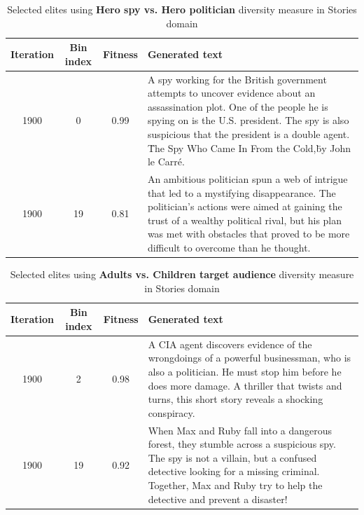 \begin{table}[H]
  \caption{Selected elites using \textbf{Hero spy vs. Hero politician} diversity measure in Stories domain}
  \label{tab:dm-hero}
  \begin{center}
  \begin{tabular}{cccp{8.5cm}}
    \toprule
    Iteration     & Bin index  & Fitness     & Generated text \\
    \midrule
    1900 &  0 & 0.99 & A spy working for the British government attempts to uncover evidence about an assassination plot. One of the people he is spying on is the U.S. president. The spy is also suspicious that the president is a double agent. \"The Spy Who Came In From the Cold,\" by John le Carré. \\
    \midrule
    1900 & 19 & 0.81 & An ambitious politician spun a web of intrigue that led to a mystifying disappearance. The politician's actions were aimed at gaining the trust of a wealthy political rival, but his plan was met with obstacles that proved to be more difficult to overcome than he thought. \\
    \bottomrule
  \end{tabular}
  \end{center}
\end{table}

\begin{table}[H]
  \caption{Selected elites using \textbf{Adults vs. Children target audience} diversity measure in Stories domain}
  \label{tab:dm-target-audience}
  \begin{center}
  \begin{tabular}{cccp{8.5cm}}
    \toprule
    Iteration     & Bin index  & Fitness     & Generated text \\
    \midrule
    1900 &  2 & 0.98 & A CIA agent discovers evidence of the wrongdoings of a powerful businessman, who is also a politician. He must stop him before he does more damage. A thriller that twists and turns, this short story reveals a shocking conspiracy. \\
    \midrule
    1900 & 19 & 0.92 & When Max and Ruby fall into a dangerous forest, they stumble across a suspicious spy. The spy is not a villain, but a confused detective looking for a missing criminal. Together, Max and Ruby try to help the detective and prevent a disaster! \\
    \bottomrule
  \end{tabular}
  \end{center}
\end{table}

